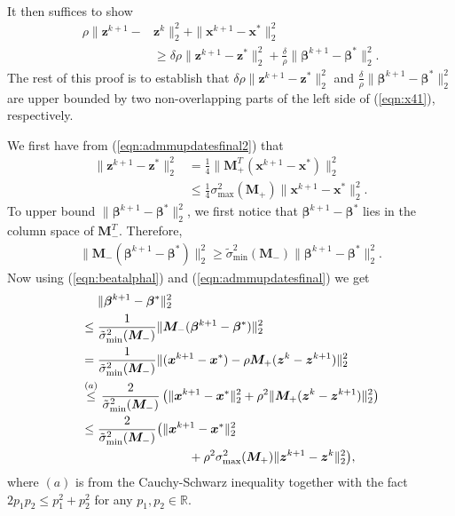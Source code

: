 \documentclass[journal]{IEEEtran}
\newcommand{\nn}{\nonumber}
\begin{document}
\begin{IEEEproof}
\begin{equation}
\begin{aligned}
\end{aligned}
\end{equation}
It then suffices to show
\begin{align}
\rho\|\bm z^{k+1}-&\bm z^k\|_2^2+\|\bm x^{k+1}-\bm x^*\|_2^2\nn\\&
\label{eqn:x41}
\geq\delta\rho\|\bm z^{k+1}-\bm z^*\|_2^2+\frac{\delta}{\rho}\|\bm\beta^{k+1}-\bm\beta^*\|_2^2.
\end{align}
The rest of this proof is to establish that $\delta\rho\|\bm z^{k+1}-\bm z^*\|_2^2$ and $\frac{\delta}{\rho}\|\bm\beta^{k+1}-\bm\beta^*\|_2^2$ are upper bounded by two non-overlapping parts of the left side of (\ref{eqn:x41}), respectively.  

We first have from (\ref{eqn:admmupdatesfinal2}) that
\begin{align}
\label{eqn:x5}
\|\bm z^{k+1}-\bm z^*\|_2^2&=\frac{1}{4}\|\bm M_+^T(\bm x^{k+1}-\bm x^*)\|^2_2\nn\\&\leq\frac{1}{4}\sigma_{\max}^2(\bm M_+)\|\bm x^{k+1}-\bm x^*\|_2^2.
\end{align}
To upper bound $\|\bm\beta^{k+1}-\bm\beta^*\|_2^2$, we first notice that $\bm\beta^{k+1}-\bm\beta^*$ lies in the column space of $\bm M_-^T$. Therefore, 
\begin{align}
\label{eqn:beatalphal}
\|\bm M_-(\bm\beta^{k+1}-\bm\beta^*)\|_2^2\geq{\tilde{\sigma}}_{\min}^2(\bm M_-)\|\bm\beta^{k+1}-\bm\beta^*\|_2^2.
\end{align}
Now using (\ref{eqn:beatalphal}) and (\ref{eqn:admmupdatesfinal}) we get 
\begin{align}
&~~~~\|\bm \beta^{k+1}-\bm \beta^*\|_2^2\nn\\
&\leq\frac{1}{{\tilde{\sigma}}_{\min}^2(\bm M_-)}\|\bm M_-(\bm\beta^{k+1}-\bm\beta^*)\|_2^2\nn\\
&=\frac{1}{{\tilde{\sigma}}_{\min}^2(\bm M_-)}\|(\bm x^{k+1}-\bm x^*)-\rho \bm M_+(\bm z^k-\bm z^{k+1})\|_2^2\nn\\
&\stackrel{(a)}{\leq} \frac{2}{{\tilde{\sigma}}_{\min}^2(\bm M_-)}\left(\|\bm x^{k+1}-\bm x^*\|_2^2+\rho^2\|\bm M_+(\bm z^k-\bm z^{k+1})\|_2^2\right)\nn\\
\label{eqn:x62}
&\leq\frac{2}{{\tilde{\sigma}}_{\min}^2(\bm M_-)}\big(\|\bm x^{k+1}-\bm x^*\|_2^2\nn\\
&\hspace{1.2in}+\rho^2\sigma_{\max}^2(\bm M_+)\|\bm z^{k+1}-\bm z^k\|_2^2\big),
\end{align}
where $(a)$ is from the Cauchy-Schwarz inequality together with the fact $2p_1p_2\leq p_1^2+p_2^2$ for any $p_1,p_2\in\mathbb{R}$.

\end{IEEEproof}
\end{document}
